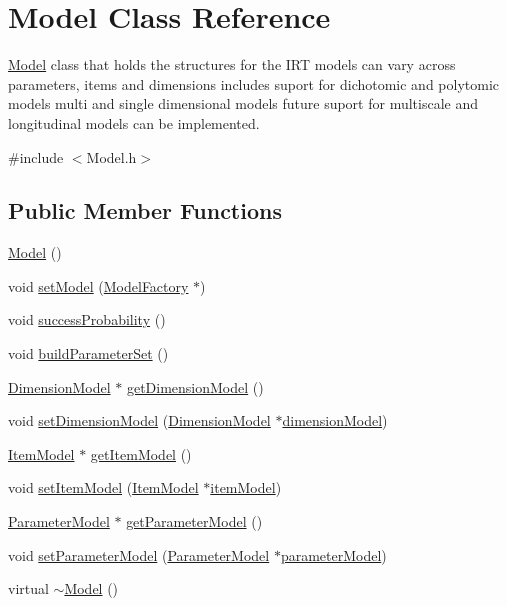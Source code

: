 \hypertarget{classModel}{}\section{Model Class Reference}
\label{classModel}


\hyperlink{classModel}{Model} class that holds the structures for the I\+R\+T models can vary across parameters, items and dimensions includes suport for dichotomic and polytomic models multi and single dimensional models future suport for multiscale and longitudinal models can be implemented.  




{\ttfamily \#include $<$Model.\+h$>$}

\subsection*{Public Member Functions}
\begin{DoxyCompactItemize}
\item 
\hyperlink{classModel_ae3b375de5f6df4faf74a95d64748e048}{Model} ()
\item 
void \hyperlink{classModel_ae45902b145dcab45eaa0809b67aa0ac8}{set\+Model} (\hyperlink{classModelFactory}{Model\+Factory} $\ast$)
\item 
void \hyperlink{classModel_ab6469058eb7c0bf5e14e5d5f2020c0bc}{success\+Probability} ()
\item 
void \hyperlink{classModel_a82cf0120ed0dd2fc0d5637ca93d63f48}{build\+Parameter\+Set} ()
\item 
\hyperlink{classDimensionModel}{Dimension\+Model} $\ast$ \hyperlink{classModel_a19bf0ae24a594e5140fd4a765f951299}{get\+Dimension\+Model} ()
\item 
void \hyperlink{classModel_adb63357558444e8acaefef6f4b5103f7}{set\+Dimension\+Model} (\hyperlink{classDimensionModel}{Dimension\+Model} $\ast$\hyperlink{classModel_aee1e88d3aaf63a2fce339425bbc3be88}{dimension\+Model})
\item 
\hyperlink{classItemModel}{Item\+Model} $\ast$ \hyperlink{classModel_a378677890d8c2ef90efa88a4aa08555e}{get\+Item\+Model} ()
\item 
void \hyperlink{classModel_a9a207633c4de3b0a84421023a5af4568}{set\+Item\+Model} (\hyperlink{classItemModel}{Item\+Model} $\ast$\hyperlink{classModel_aabd14d0c1c8d0c9f20df59d9ecf05e9f}{item\+Model})
\item 
\hyperlink{classParameterModel}{Parameter\+Model} $\ast$ \hyperlink{classModel_a73fa05b38e29e6ec766ec1ddc6af99e4}{get\+Parameter\+Model} ()
\item 
void \hyperlink{classModel_a817f599d0318ac1f4752f49eb5f8e909}{set\+Parameter\+Model} (\hyperlink{classParameterModel}{Parameter\+Model} $\ast$\hyperlink{classModel_a169a32617c83dcbbc03512b9eb7f04fb}{parameter\+Model})
\item 
virtual \hyperlink{classModel_ad6ebd2062a0b823db841a0b88baac4c0}{$\sim$\+Model} ()
\end{DoxyCompactItemize}
